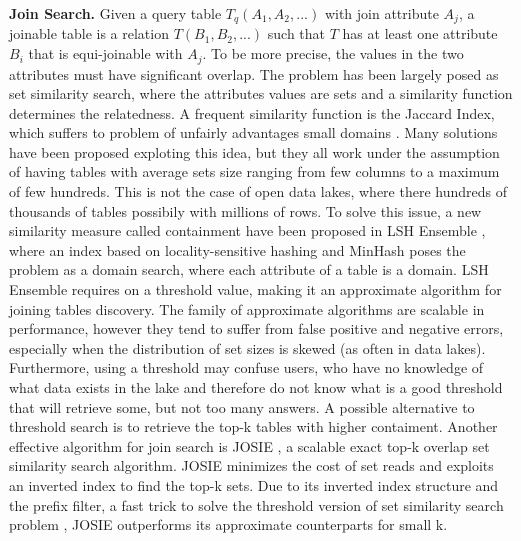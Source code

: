 \textbf{Join Search.} Given a query table $T_q(A_1,A_2,...)$ with join attribute $A_j$, a joinable table is a relation $T(B_1, B_2,...)$ such that $T$ has at least one attribute $B_i$ that is equi-joinable with $A_j$. To be more precise, the values in the two attributes must have significant overlap. The problem has been largely posed as set similarity search, where the attributes values are sets and a similarity function determines the relatedness. A frequent similarity function is the Jaccard Index, which suffers to problem of unfairly advantages small domains \cite{zhu2016lsh}. Many solutions have been proposed exploting this idea, but they all work under the assumption of having tables with average sets size ranging from few columns to a maximum of few hundreds. This is not the case of open data lakes, where there hundreds of thousands of tables possibily with millions of rows. To solve this issue, a new similarity measure called containment have been proposed in LSH Ensemble \cite{zhu2016lsh}, where an index based on locality-sensitive hashing \cite{gionis1999similarity} and MinHash \cite{indyk1998approximate} poses the problem as a domain search, where each attribute of a table is a domain. LSH Ensemble requires on a threshold value, making it an approximate algorithm for joining tables discovery. The family of approximate algorithms are scalable in performance, however they tend to suffer from false positive and negative errors, especially when the distribution of set sizes is skewed (as often in data lakes). Furthermore, using a threshold may confuse users, who have no knowledge of what data exists in the lake and therefore do not know what is a good threshold that will retrieve some, but not too many answers. A possible alternative to threshold search is to retrieve the top-k tables with higher contaiment. Another effective algorithm for join search is JOSIE \cite{zhu2019josie}, a scalable exact top-k overlap set similarity search algorithm. JOSIE minimizes the cost of set reads and exploits an inverted index to find the top-k sets. Due to its inverted index structure and the prefix filter, a fast trick to solve the threshold version of set similarity search problem \cite{chaudhuri2006primitive}, JOSIE outperforms its approximate counterparts for small k.
\bigbreak

